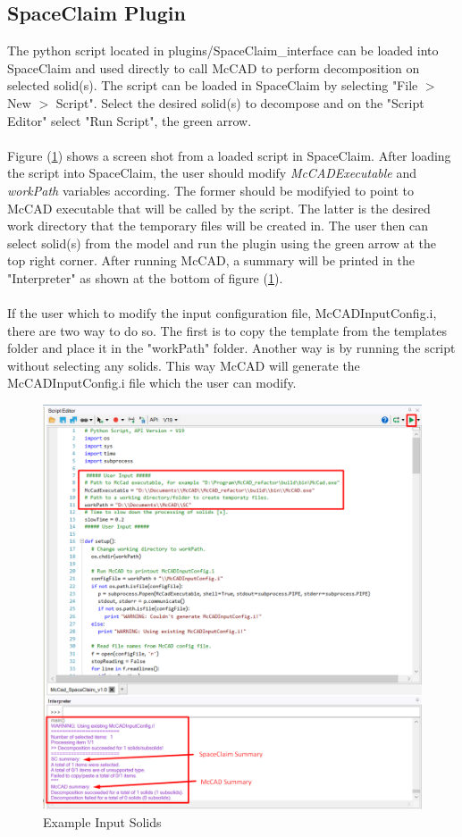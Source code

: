 \documentclass[12pt, a4paper, titlepage]{article}
\begin{document}
  \subsection{SpaceClaim Plugin}
    The python script located in plugins/SpaceClaim\_interface can be loaded into SpaceClaim and used directly to call McCAD to perform decomposition on selected solid(s).  The script can be loaded in SpaceClaim by selecting "File $>$ New $>$ Script". Select the desired solid(s) to decompose and on the "Script Editor" select "Run Script", the green arrow.
    \\\\
    Figure (\ref{fig:SCPlugin}) shows a screen shot from a loaded script in SpaceClaim. After loading the script into SpaceClaim, the user should modify \emph{McCADExecutable} and \emph{workPath} variables according. The former should be modifyied to point to McCAD executable that will be called by the script. The latter is the desired work directory that the temporary files will be created in. The user then can select solid(s) from the model and run the plugin using the green arrow at the top right corner. After running McCAD, a summary will be printed in the "Interpreter" as shown at the bottom of figure (\ref{fig:SCPlugin}).
    \\\\
    If the user which to modify the input configuration file, McCADInputConfig.i, there are two way to do so. The first is to copy the template from the templates folder and place it in the "workPath" folder. Another way is by running the script without selecting any solids. This way McCAD will generate the McCADInputConfig.i file which the user can modify.
    \begin{figure}[h!]
    	\centering
    	\includegraphics[scale=0.5]{figures/SC_plugin.png}
    	\caption{Example Input Solids}
    	\label{fig:SCPlugin}
    \end{figure}
\end{document}
